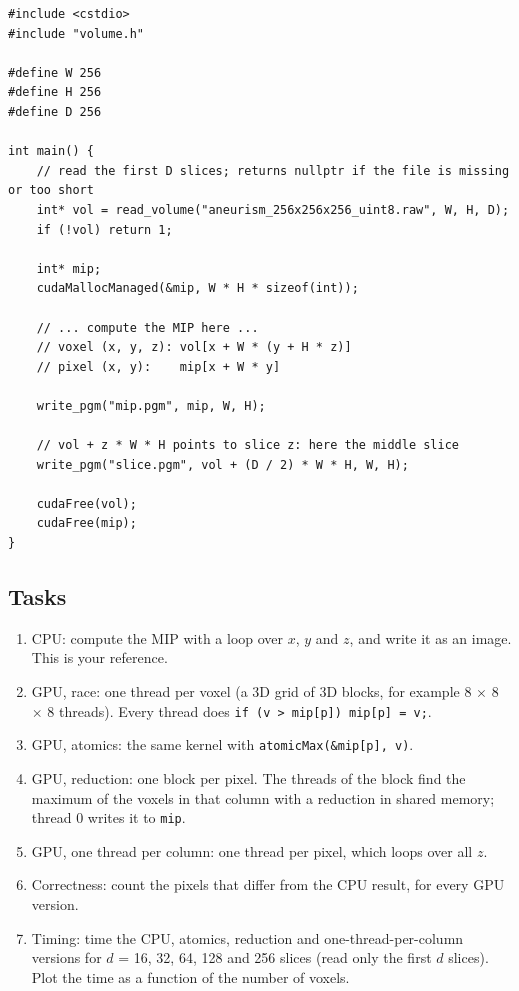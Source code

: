 \documentclass[main.tex]{subfiles}
\begin{document}
\begin{lstlisting}[language=CUDA]
#include <cstdio>
#include "volume.h"

#define W 256
#define H 256
#define D 256

int main() {
    // read the first D slices; returns nullptr if the file is missing or too short
    int* vol = read_volume("aneurism_256x256x256_uint8.raw", W, H, D);
    if (!vol) return 1;

    int* mip;
    cudaMallocManaged(&mip, W * H * sizeof(int));

    // ... compute the MIP here ...
    // voxel (x, y, z): vol[x + W * (y + H * z)]
    // pixel (x, y):    mip[x + W * y]

    write_pgm("mip.pgm", mip, W, H);

    // vol + z * W * H points to slice z: here the middle slice
    write_pgm("slice.pgm", vol + (D / 2) * W * H, W, H);

    cudaFree(vol);
    cudaFree(mip);
}
\end{lstlisting}

\subsection{Tasks}
\begin{enumerate}[nosep]
  \item CPU: compute the MIP with a loop over $x$, $y$ and $z$, and write it as an image. This is your reference.
  \item GPU, race: one thread per voxel (a 3D grid of 3D blocks, for example 8 $\times$ 8 $\times$ 8 threads). Every thread does \texttt{if (v > mip[p]) mip[p] = v;}.
  \item GPU, atomics: the same kernel with \texttt{atomicMax(\&mip[p], v)}.
  \item GPU, reduction: one block per pixel. The threads of the block find the maximum of the voxels in that column with a reduction in shared memory; thread 0 writes it to \texttt{mip}.
  \item GPU, one thread per column: one thread per pixel, which loops over all $z$.
  \item Correctness: count the pixels that differ from the CPU result, for every GPU version.
  \item Timing: time the CPU, atomics, reduction and one-thread-per-column versions for $d$ = 16, 32, 64, 128 and 256 slices (read only the first $d$ slices). Plot the time as a function of the number of voxels.
\end{enumerate}
\end{document}
